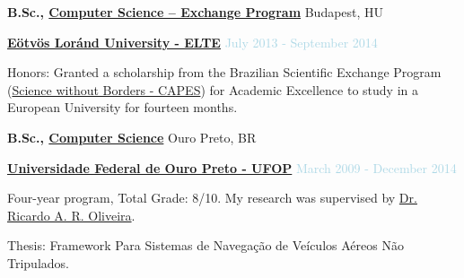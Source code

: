 \medskip

\textbf{B.Sc., 
        \href{https://www.elte.hu}
             {Computer Science -- Exchange Program}} \hfill Budapest, HU

\begin{outerlist}

\item[] \href{https://www.elte.hu}{\textbf{Eötvös Loránd University - ELTE}} \hfill {\textcolor{lightblue}{July 2013 - September 2014}} \medskip
        \begin{innerlist}[-]
        \item Honors: Granted a scholarship from the Brazilian Scientific Exchange Program (\href{http://capes.gov.br/images/stories/download/diversos/folder-SWB.pdf}{Science without Borders - CAPES}) for Academic Excellence to study in a European University for fourteen months.
        \end{innerlist}

\end{outerlist}

\textbf{B.Sc., 
        \href{https://ufop.br}
             {Computer Science}} \hfill Ouro Preto, BR

\begin{outerlist}

\item[] \href{https://ufop.br}{\textbf{Universidade Federal de Ouro Preto - UFOP}} \hfill {\textcolor{lightblue}{March 2009 - December 2014}} \medskip
        \begin{innerlist}[-]
        \item Four-year program, Total Grade: 8/10. My research was supervised by \href{http://buscatextual.cnpq.br/buscatextual/visualizacv.do?id=K4701865J6}{Dr. Ricardo A. R. Oliveira}.
        \item Thesis: Framework Para Sistemas de Navegação de Veículos Aéreos Não Tripulados.
        \end{innerlist}

\end{outerlist}

